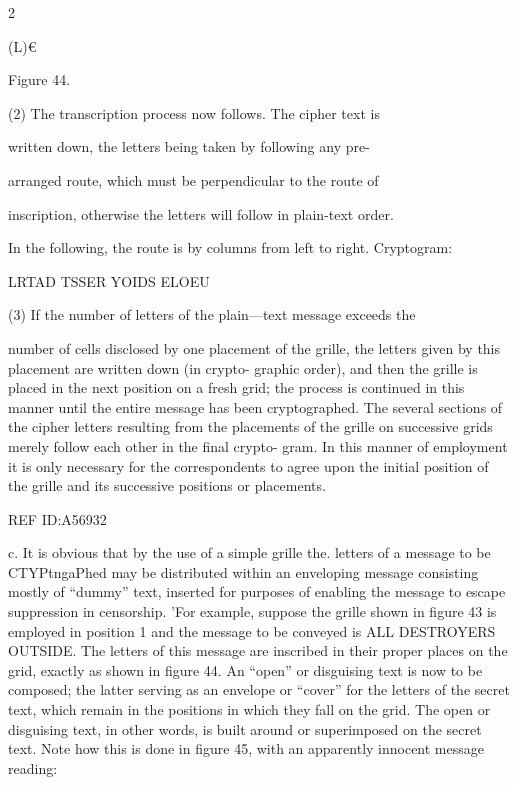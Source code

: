  

 

 

 

 

 

 

2%

 

(L)€

Figure 44.

(2) The transcription process now follows. The cipher text is

written down, the letters being taken by following any pre-

arranged route, which must be perpendicular to the route of

inscription, otherwise the letters will follow in plain-text order.

In the following, the route is by columns from left to right.
Cryptogram:

LRTAD TSSER YOIDS ELOEU

(3) If the number of letters of the plain—text message exceeds the

number of cells disclosed by one placement of the grille, the
letters given by this placement are written down (in crypto-
graphic order), and then the grille is placed in the next position
on a fresh grid; the process is continued in this manner until
the entire message has been cryptographed. The several sections
of the cipher letters resulting from the placements of the grille
on successive grids merely follow each other in the ﬁnal crypto-
gram. In this manner of employment it is only necessary for
the correspondents to agree upon the initial position of the grille
and its successive positions or placements.

REF ID:A56932

c. It is obvious that by the use of a simple grille the. letters of a
message to be CTYPtngaPhed may be distributed within an enveloping
message consisting mostly of “dummy” text, inserted for purposes of
enabling the message to escape suppression in censorship. 'For example,
suppose the grille shown in ﬁgure 43 is employed in position 1 and the
message to be conveyed is ALL DESTROYERS OUTSIDE. The
letters of this message are inscribed in their proper places on the grid,
exactly as shown in ﬁgure 44. An “open” or disguising text is now to
be composed; the latter serving as an envelope or “cover” for the letters
of the secret text, which remain in the positions in which they fall on
the grid. The open or disguising text, in other words, is built around or
superimposed on the secret text. Note how this is done in ﬁgure 45, with
an apparently innocent message reading:

